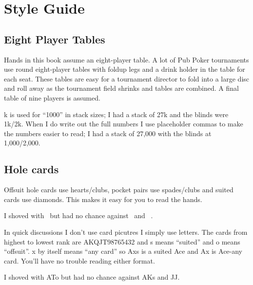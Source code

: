 \chapter{Style Guide}


\section*{Eight Player Tables}

Hands in this book assume an eight-player table. A lot of Pub
Poker tournaments use round eight-player tables with foldup legs and a
drink holder in the table for each seat. These tables are easy for a
tournament director to fold into a large disc and roll away as the
tournament field shrinks and tables are combined. A final table of
nine players is assumed.

k is used for ``1000'' in stack sizes; I had a stack of 27k and the
blinds were 1k/2k. When I do write out the full numbers I use
placeholder commas to make the numbers easier to read; I had a stack
of 27,000 with the blinds at 1,000/2,000.

\section*{Hole cards}

Offsuit hole cards use hearts/clubs, pocket pairs use spades/clubs and
suited cards use diamonds. This makes it easy for you to read the hands.

I shoved with \Ah\tenc\ but had no chance against \Ad\Kd\ and \Js\Jc\ .

In quick discussions I don't use card picutres I simply use
letters. The cards from highest to lowest rank are AKQJT98765432 and s
means ``suited'' and o means ``offsuit''. x by itself means ``any
card'' so Axs is a suited Ace and Ax is Ace-any card. You'll have no
trouble reading either format.

I shoved with ATo but had no chance against AKs and JJ.



